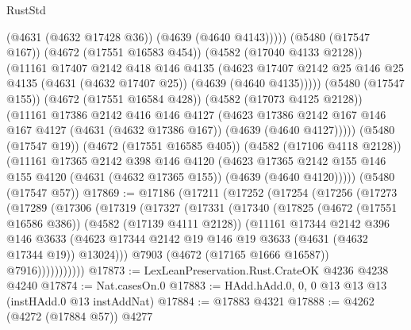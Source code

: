 \begin{lexlean}{RustStd}
\begin{coremodule}
                (@4631 (@4632 @17428 @36))
                (@4639 (@4640 @4143)))))
          (@5480 (@17547 @167))
          (@4672 (@17551 @16583 @454))
          (@4582 (@17040 @4133 @2128))
          (@11161
            @17407
            @2142
            @418
            @146
            @4135
            (@4623
              @17407
              @2142
              @25
              @146
              @25
              @4135
              (@4631 (@4632 @17407 @25))
              (@4639 (@4640 @4135)))))
        (@5480 (@17547 @155))
        (@4672 (@17551 @16584 @428))
        (@4582 (@17073 @4125 @2128))
        (@11161
          @17386
          @2142
          @416
          @146
          @4127
          (@4623
            @17386
            @2142
            @167
            @146
            @167
            @4127
            (@4631 (@4632 @17386 @167))
            (@4639 (@4640 @4127)))))
      (@5480 (@17547 @19))
      (@4672 (@17551 @16585 @405))
      (@4582 (@17106 @4118 @2128))
      (@11161
        @17365
        @2142
        @398
        @146
        @4120
        (@4623
          @17365
          @2142
          @155
          @146
          @155
          @4120
          (@4631 (@4632 @17365 @155))
          (@4639 (@4640 @4120)))))
    (@5480 (@17547 @57))
@17869 := @17186
    (@17211
      (@17252
        (@17254
          (@17256
            (@17273
              (@17289
                (@17306
                  (@17319
                    (@17327
                      (@17331
                        (@17340
                          (@17825
                            (@4672 (@17551 @16586 @386))
                            (@4582 (@17139 @4111 @2128))
                            (@11161
                              @17344
                              @2142
                              @396
                              @146
                              @3633
                              (@4623
                                @17344
                                @2142
                                @19
                                @146
                                @19
                                @3633
                                (@4631 (@4632 @17344 @19))
                                @13024)))
                          @7903
                          (@4672 (@17165 @1666 @16587))
                          @7916)))))))))))
@17873 := LexLeanPreservation.Rust.CrateOK @4236 @4238 @4240
@17874 := Nat.casesOn.{0}
@17883 := HAdd.hAdd.{0, 0, 0} @13 @13 @13 (instHAdd.{0} @13 instAddNat)
@17884 := @17883 @4321
@17888 := @4262 (@4272 (@17884 @57)) @4277

\end{coremodule}
\end{lexlean}

